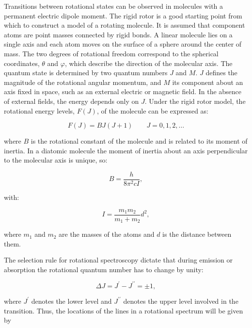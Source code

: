 \documentclass[
  9pt,
]{extbook}
\theoremstyle{definition}
\theoremstyle{definition}
\theoremstyle{definition}
\theoremstyle{remark}
\begin{document}
Transitions between rotational states can be observed in molecules with a permanent electric dipole moment. The rigid rotor is a good starting point from which to construct a model of a rotating molecule. It is assumed that component atoms are point masses connected by rigid bonds. A linear molecule lies on a single axis and each atom moves on the surface of a sphere around the center of mass. The two degrees of rotational freedom correspond to the spherical coordinates, \(\theta\) and \(\varphi\), which describe the direction of the molecular axis. The quantum state is determined by two quantum numbers \(J\) and \(M\). \(J\) defines the magnitude of the rotational angular momentum, and \(M\) its component about an axis fixed in space, such as an external electric or magnetic field. In the absence of external fields, the energy depends only on \(J\). Under the rigid rotor model, the rotational energy levels, \(F(J)\), of the molecule can be expressed as:

\begin{equation}
F\left(J\right)=BJ\left(J+1\right)\qquad J=0,1,2,\ldots
\label{eq:rot1}
\end{equation}

where \(B\) is the rotational constant of the molecule and is related to its moment of inertia. In a diatomic molecule the moment of inertia about an axis perpendicular to the molecular axis is unique, so:

\begin{equation}
B={\frac{h}{8\pi ^{2}cI}},
\label{eq:rot2}
\end{equation}

with:

\begin{equation}
 I=\frac{m_1m_2}{m_1 +m_2}d^2,
 \label{eq:rot3}
\end{equation}

where \(m_1\) and \(m_2\) are the masses of the atoms and \(d\) is the distance between them.

The selection rule for rotational spectroscopy dictate that during emission or absorption the rotational quantum number has to change by unity:

\begin{equation}
 \Delta J = J^{{\prime }} - J^{{\prime \prime }} = \pm 1,
 \label{eq:rot4}
\end{equation}

where \(J^{{\prime }}\) denotes the lower level and \(J^{{\prime \prime }}\) denotes the upper level involved in the transition. Thus, the locations of the lines in a rotational spectrum will be given by
\end{document}
